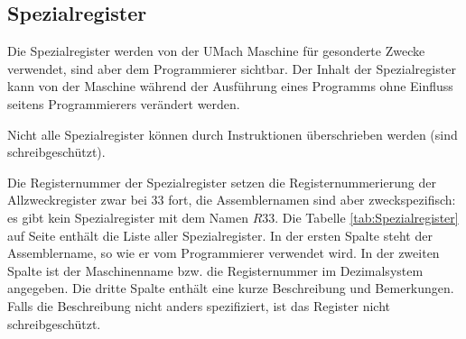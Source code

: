 \subsection{Spezialregister}
\label{subsec:Spezialregister}
Die Spezialregister werden von der UMach Maschine für gesonderte Zwecke
verwendet, sind aber dem Programmierer sichtbar. Der Inhalt der Spezialregister
kann von der Maschine während der Ausführung eines Programms ohne Einfluss
seitens Programmierers verändert werden.

Nicht alle Spezialregister können durch Instruktionen überschrieben werden
(sind schreibgeschützt).

Die Registernummer der Spezialregister setzen die Registernummerierung
der Allzweckregister zwar bei 33 fort, die Assemblernamen sind aber
zweckspezifisch: es gibt kein Spezialregister mit dem Namen $R33$.
Die Tabelle \ref{tab:Spezialregister} auf Seite \pageref{tab:Spezialregister}
enthält die Liste aller Spezialregister. In der ersten
Spalte steht der Assemblername, so wie er vom Programmierer verwendet wird. In
der zweiten Spalte ist der Maschinenname bzw. die Registernummer im
Dezimalsystem angegeben.
Die dritte Spalte enthält eine kurze Beschreibung und Bemerkungen.
Falls die Beschreibung nicht anders spezifiziert, ist das Register nicht
schreibgeschützt.

